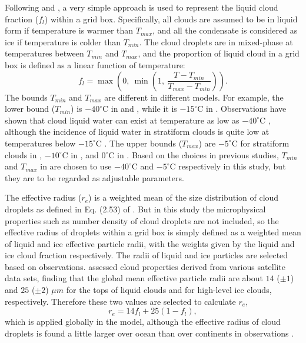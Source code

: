 Following \citet{Ose1993} and \citet{Boville2006}, a very simple approach is used to represent the liquid cloud fraction ($f_l$) within a grid box. Specifically, all clouds are assumed to be in liquid form if temperature is warmer than $T_{max}$, and all the condensate is considered as ice if temperature is colder than $T_{min}$. The cloud droplets are in mixed-phase at temperatures between $T_{min}$ and $T_{max}$, and the proportion of liquid cloud in a grid box is defined as a linear function of temperature:
\begin{equation}
	f_{l} =\max\left(0, ~\min\left(1, ~\frac{T-T_{min}}{T_{max}-T_{min}} \right)\right).
	\label{eq:liquid_frac}
\end{equation}
The bounds $T_{min}$ and $T_{max}$ are different in different models. For example, the lower bound ($T_{min}$) is $-40^{\circ}$C in \citet{Ose1993} and \citet{Boville2006}, while it is $-15^{\circ}$C in \citet{Smith1990}. Observations have shown that cloud liquid water can exist at temperature as low as $-40^{\circ}$C \citep{Heymsfield1993}, although the incidence of liquid water in stratiform clouds is quite low at temperatures below $-15^{\circ}$C \citep{Ryan1996}. The upper bounds ($T_{max}$) are $-5^{\circ}$C for stratiform clouds in \citet{Ose1993}, $-10^{\circ}$C in \citet{Boville2006}, and $0^{\circ}$C in \citet{Smith1990}. Based on the choices in previous studies, $T_{min}$ and $T_{max}$ in  are chosen to use $-40^{\circ}$C and $-5^{\circ}$C respectively in this study, but they are to be regarded as adjustable parameters.

The effective radius ($r_{e}$) is a weighted mean of the size distribution of cloud droplets as defined in Eq. (2.53) of \cite{Hansen1974light}. But in this study the microphysical properties such as number density of cloud droplets are not included, so the effective radius of droplets within a grid box is simply defined as a weighted mean of liquid and ice effective particle radii, with the weights given by the liquid and ice cloud fraction respectively. The radii of liquid and ice particles are selected based on observations. \citet{Stubenrauch2013} assessed cloud properties derived from various satellite data sets, finding that the global mean effective particle radii are about $14$ ($\pm1$) and $25$ ($\pm2$) $\mu m$ for the tops of liquid clouds and for high-level ice clouds, respectively. Therefore these two values are selected to calculate $r_e$,
\begin{equation}
	r_e = 14f_l + 25(1-f_l),
	\label{eq:Reff}
\end{equation}
which is applied globally in the model, although the effective radius of cloud droplets is found a little larger over ocean than over continents in observations \citep{Stubenrauch2013}.

